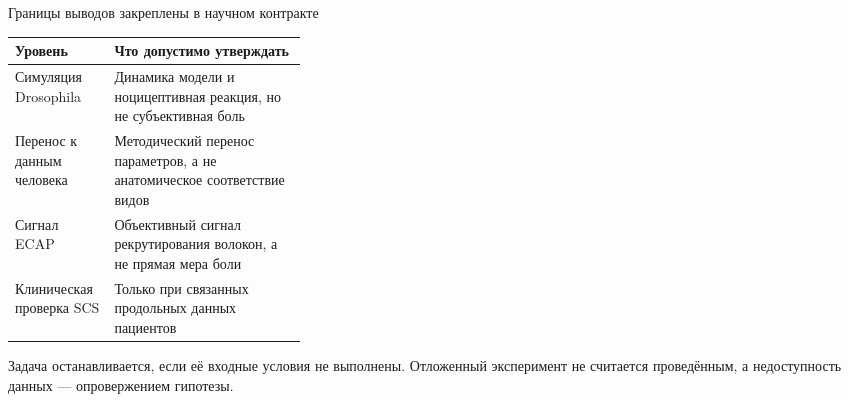 \begin{frame}{Границы выводов закреплены в научном контракте}
\begin{tabularx}{\linewidth}{|L{0.34\linewidth}|Y|}
\hline Уровень & Что допустимо утверждать \\\hline
Симуляция Drosophila & Динамика модели и ноцицептивная реакция, но не субъективная боль \\\hline
Перенос к данным человека & Методический перенос параметров, а не анатомическое соответствие видов \\\hline
Сигнал ECAP & Объективный сигнал рекрутирования волокон, а не прямая мера боли \\\hline
Клиническая проверка SCS & Только при связанных продольных данных пациентов \\\hline
\end{tabularx}
\SlideGap
Задача останавливается, если её входные условия не выполнены. Отложенный эксперимент не считается проведённым, а недоступность данных --- опровержением гипотезы.
\end{frame}
